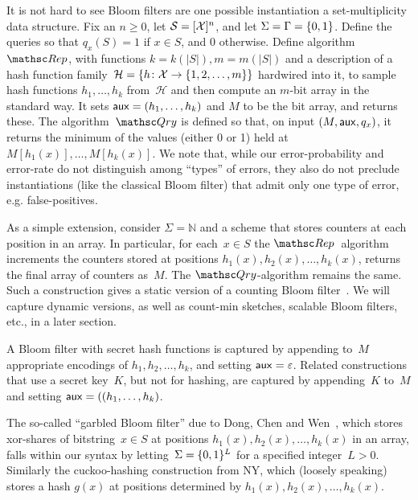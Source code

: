 It is not hard to see Bloom filters are one possible instantiation a set-multiplicity data structure.
Fix an $n \geq 0$, let $\mathcal{S}=[{\cal X}]^n$, and let $\Sigma=\Gamma=\{0,1\}$.  
Define the queries so that $q_x(S)=1$ if $x \in S$, and 0 otherwise.  Define algorithm~$\Rep$, with functions $k=k(|S|), m=m(|S|)$ and a description of a hash function family~$\mathcal{H}=\{h \colon {\cal X} \to \{1,2,\ldots,m\}\}$ hardwired into it, to sample hash functions $h_1, \ldots, h_k$ from~$\mathcal{H}$ and then compute an $m$-bit array in the standard way.  It sets ${\sf aux} = (h_1, \ldots, h_k)$ and $M$ to be the bit array, and returns these.  The algorithm~$\Qry$ is defined so that, on input $(M,{\sf aux},q_x)$, it returns the minimum of the values (either 0 or 1) held at $M[h_1(x)],\ldots,M[h_k(x)]$.  We note that, while our error-probability and error-rate do not distinguish among ``types'' of errors, they also do not preclude instantiations (like the classical Bloom filter) that admit only one type of error, e.g. false-positives.  

As a simple extension, consider $\Sigma=\mathbb{N}$ and a scheme that stores counters at each position in an array.  In particular, for each~$x \in S$ the $\Rep$~algorithm increments the counters stored at positions $h_1(x), h_2(x), \ldots, h_k(x)$, returns the final array of counters as~$M$.  The $\Qry$-algorithm remains the same. Such a construction gives a static version of a counting Bloom filter~\cite{xxx}.  We will capture dynamic versions, as well as count-min sketches, scalable Bloom filters, etc., in a later section.

A Bloom filter with secret hash functions is captured by appending to~$M$ appropriate encodings of $h_1,h_2,\ldots,h_k$, and setting ${\sf aux}=\varepsilon$.  Related constructions  that use a secret key~$K$, but not for hashing, are captured by appending~$K$ to~$M$ and setting ${\sf aux}=((h_1, \ldots, h_k)$.

The so-called ``garbled Bloom filter'' due to Dong, Chen and Wen~\cite{xxx}, which stores xor-shares of bitstring~$x \in S$ at positions $h_1(x),h_2(x),\ldots,h_k(x)$ in an array, falls within our syntax by letting~$\Sigma=\{0,1\}^L$ for a specified integer~$L>0$.  Similarly the cuckoo-hashing construction from NY, which (loosely speaking) stores a hash $g(x)$ at positions determined by $h_1(x),h_2(x),\ldots,h_k(x)$.   


